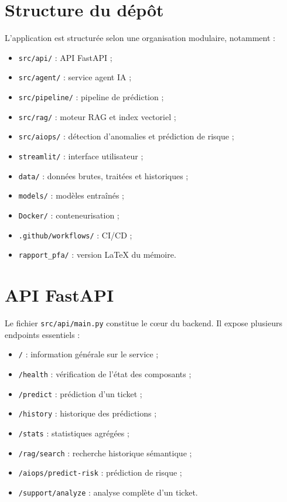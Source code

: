 \documentclass[11pt,a4paper]{report}
\begin{document}
\section{Structure du dépôt}
L’application est structurée selon une organisation modulaire, notamment :
\begin{itemize}[leftmargin=1.3em]
    \item \texttt{src/api/} : API FastAPI ;
    \item \texttt{src/agent/} : service agent IA ;
    \item \texttt{src/pipeline/} : pipeline de prédiction ;
    \item \texttt{src/rag/} : moteur RAG et index vectoriel ;
    \item \texttt{src/aiops/} : détection d’anomalies et prédiction de risque ;
    \item \texttt{streamlit/} : interface utilisateur ;
    \item \texttt{data/} : données brutes, traitées et historiques ;
    \item \texttt{models/} : modèles entraînés ;
    \item \texttt{Docker/} : conteneurisation ;
    \item \texttt{.github/workflows/} : CI/CD ;
    \item \texttt{rapport\_pfa/} : version LaTeX du mémoire.
\end{itemize}

\section{API FastAPI}
Le fichier \texttt{src/api/main.py} constitue le cœur du backend. Il expose plusieurs endpoints essentiels :
\begin{itemize}[leftmargin=1.3em]
    \item \texttt{/} : information générale sur le service ;
    \item \texttt{/health} : vérification de l’état des composants ;
    \item \texttt{/predict} : prédiction d’un ticket ;
    \item \texttt{/history} : historique des prédictions ;
    \item \texttt{/stats} : statistiques agrégées ;
    \item \texttt{/rag/search} : recherche historique sémantique ;
    \item \texttt{/aiops/predict-risk} : prédiction de risque ;
    \item \texttt{/support/analyze} : analyse complète d’un ticket.
\end{itemize}
\end{document}
